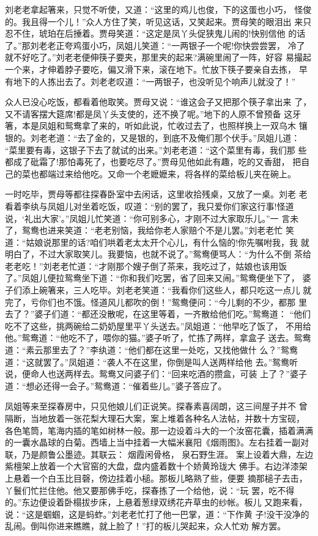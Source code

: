 刘老老拿起箸来，只觉不听使，又道：“这里的鸡儿也俊，下的这蛋也小巧，
怪俊的。我且得一个儿！”众人方住了笑，听见这话，又笑起来。贾母笑的眼泪出
来只忍不住，琥珀在后捶着。贾母笑道：“这定是凤丫头促狭鬼儿闹的!快别信他
的话了。”那刘老老正夸鸡蛋小巧，凤姐儿笑道：“一两银子一个呢!你快尝尝罢，
冷了就不好吃了。”刘老老便伸筷子要夹，那里夹的起来?满碗里闹了一阵，好容
易撮起一个来，才伸着脖子要吃，偏又滑下来，滚在地下。忙放下筷子要亲自去拣，
早有地下的人拣出去了。刘老老叹道：“一两银子，也没听见个响声儿就没了！”

众人已没心吃饭，都看着他取笑。贾母又说：“谁这会子又把那个筷子拿出来
了，又不请客摆大筵席!都是凤丫头支使的，还不换了呢。”地下的人原不曾预备
这牙箸，本是凤姐和鸳鸯拿了来的，听如此说，忙收过去了，也照样换上一双乌木
镶银的。刘老老道：“去了金的，又是银的，到底不及俺们那个伏手。”凤姐儿道：
“菜里要有毒，这银子下去了就试的出来。”刘老老道：“这个菜里有毒，我们那
些都成了砒霜了!那怕毒死了，也要吃尽了。”贾母见他如此有趣，吃的又香甜，
把自己的菜也都端过来给他吃。又命一个老嬷嬷来，将各样的菜给板儿夹在碗上。

一时吃毕，贾母等都往探春卧室中去闲话，这里收拾残桌，又放了一桌。刘老
老看着李纨与凤姐儿对坐着吃饭，叹道：“别的罢了，我只爱你们家这行事!怪道
说，‘礼出大家’。”凤姐儿忙笑道：“你可别多心，才刚不过大家取乐儿。”一
言未了，鸳鸯也进来笑道：“老老别恼，我给你老人家赔个不是儿罢。”刘老老忙
笑道：“姑娘说那里的话?咱们哄着老太太开个心儿，有什么恼的!你先嘱咐我，我
就明白了，不过大家取笑儿。我要恼，也就不说了。”鸳鸯便骂人：“为什么不倒
茶给老老吃！”刘老老忙道：“才刚那个嫂子倒了茶来，我吃过了，姑娘也该用饭
了。”凤姐儿便拉鸳鸯坐下道：“你和我们吃罢，省了回来又闹。”鸳鸯便坐下了，
婆子们添上碗箸来，三人吃毕。刘老老笑道：“我看你们这些人，都只吃这一点儿
就完了，亏你们也不饿。怪道风儿都吹的倒！”鸳鸯便问：“今儿剩的不少，都那
里去了？”婆子们道：“都还没散呢，在这里等着，一齐散给他们吃。”鸳鸯道：
“他们吃不了这些，挑两碗给二奶奶屋里平丫头送去。”凤姐道：“他早吃了饭了，
不用给他。”鸳鸯道：“他吃不了，喂你的猫。”婆子听了，忙拣了两样，拿盒子
送去。鸳鸯道：“素云那里去了？”李纨道：“他们都在这里一处吃，又找他做什
么？”鸳鸯道：“这就罢了。”凤姐道：“袭人不在这里，你倒是叫人送两样给他
去。”鸳鸯听说，便命人也送两样去。鸳鸯又问婆子们：“回来吃酒的攒盒，可装
上了？”婆子道：“想必还得一会子。”鸳鸯道：“催着些儿。”婆子答应了。

凤姐等来至探春房中，只见他娘儿们正说笑。探春素喜阔朗，这三间屋子并不
曾隔断，当地放着一张花梨大理石大案，案上堆着各种名人法帖，并数十方宝砚，
各色笔筒，笔海内插的笔如树林一般。那一边设着斗大的一个汝窑花囊，插着满满
的一囊水晶球的白菊。西墙上当中挂着一大幅米襄阳《烟雨图》。左右挂着一副对
联，乃是颜鲁公墨迹。其联云：
烟霞闲骨格，
泉石野生涯。
案上设着大鼎，左边紫檀架上放着一个大官窑的大盘，盘内盛着数十个娇黄玲珑大
佛手。右边洋漆架上悬着一个白玉比目磬，傍边挂着小槌。那板儿略熟了些，便要
摘那槌子去击，丫鬟们忙拦住他。他又要那佛手吃，探春拣了一个给他，说：“玩
罢，吃不得的。”东边便设着卧榻拔步床，上悬着葱绿双绣花卉草虫的纱帐。板儿
又跑来看，说：“这是蝈蝈，这是蚂蚱。”刘老老忙打了他一巴掌，道：“下作黄
子!没干没净的乱闹。倒叫你进来瞧瞧，就上脸了！”打的板儿哭起来，众人忙劝
解方罢。

